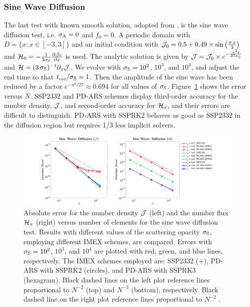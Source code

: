 \subsubsection{Sine Wave Diffusion}
The last test with known smooth solution, adopted from \cite{radice_etal_2013}, is the sine wave diffusion test, i.e. $\sigma_{{\rm A}} = 0$ and $f_0 = 0$.
A periodic domain with $D=\{x:x\in[-3,3]\}$ and an initial condition with $\mathcal{J}_{0} = 0.5+0.49\times\sin\big(\frac{\pi\,x}{3}\big)$ and $\mathcal{H}_{0} =-\frac{1}{3\sigma_{{\rm S}}}\frac{\partial \mathcal{J}_{0}}{\partial x}$ is used.
The analytic solution is given by $\mathcal{J} = \mathcal{J}_{0} \times e^{-\frac{\pi^2 t}{27\sigma_{{\rm S}}}}$ and $\mathcal{H} = (3\,\sigma_{{\rm S}})^{-1}\partial_{x}{\mathcal{J}}$.
We evolve with $\sigma_{{\rm S}}=10^{2}$, $10^{3}$, and $10^{4}$, and adjust the end time so that $t_{\mbox{\tiny end}}/\sigma_{{\rm S}}=1$. 
Then the amplitude of the sine wave has been reduced by a factor $e^{-\pi^{2}/27}\approx0.694$ for all values of $\sigma_{{\rm S}}$. 
Figure~\ref{fig:SineWaveDiffusionJ} shows the error versus $N$.
SSP2332 and PD-ARS schemes display third-order accuracy for the number density, $\mathcal{J}$, and second-order accuracy for $\mathcal{H}_{x}$, and their errors are difficult to distinguish.
PD-ARS with SSPRK2 behaves as good as SSP2332 in the diffusion region but requires 1/3 less implicit solvers.

\begin{figure}[h]
  \centering
  \centerline{\includegraphics[width=1.2\textwidth]{figures/SineWaveDiffusion}}
   \caption{Absolute error for the number density $\mathcal{J}$ (left) and the number flux $\mathcal{H}_{x}$ (right) versus number of elements for the sine wave diffusion test.  Results with different values of the scattering opacity $\sigma_{{\rm S}}$, employing different IMEX schemes, are compared.  Errors with $\sigma_{{\rm S}}=10^{2}$, $10^{3}$, and $10^{4}$ are plotted with red, green, and blue lines, respectively.  The IMEX schemes employed are:  SSP2332 ($+$), PD-ARS with SSPRK2 (circles), and PD-ARS with SSPRK3 (hexagram). Black dashed lines on the left plot reference lines proportional to $N^{-2}$ (top) and $N^{-3}$ (bottom), respectively. Black dashed line on the right plot reference lines proportional to $N^{-2}$ .}
   \label{fig:SineWaveDiffusionJ}
\end{figure}

